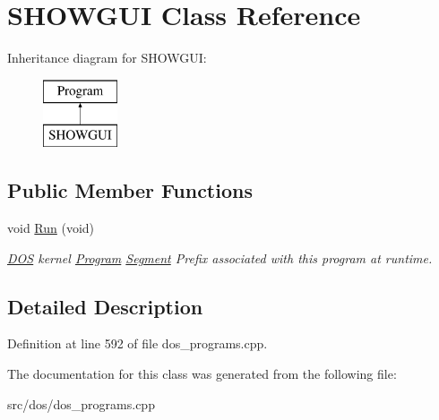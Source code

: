 \hypertarget{classSHOWGUI}{\section{S\-H\-O\-W\-G\-U\-I Class Reference}
\label{classSHOWGUI}
}
Inheritance diagram for S\-H\-O\-W\-G\-U\-I\-:\begin{figure}[H]
\begin{center}
\leavevmode
\includegraphics[height=2.000000cm]{classSHOWGUI}
\end{center}
\end{figure}
\subsection*{Public Member Functions}
\begin{DoxyCompactItemize}
\item 
\hypertarget{classSHOWGUI_a6aa41914fca5264f9c63856c9578dd29}{void \hyperlink{classSHOWGUI_a6aa41914fca5264f9c63856c9578dd29}{Run} (void)}\label{classSHOWGUI_a6aa41914fca5264f9c63856c9578dd29}

\begin{DoxyCompactList}\small\item\em \hyperlink{classDOS}{D\-O\-S} kernel \hyperlink{classProgram}{Program} \hyperlink{structSegment}{Segment} Prefix associated with this program at runtime. \end{DoxyCompactList}\end{DoxyCompactItemize}


\subsection{Detailed Description}


Definition at line 592 of file dos\-\_\-programs.\-cpp.



The documentation for this class was generated from the following file\-:\begin{DoxyCompactItemize}
\item 
src/dos/dos\-\_\-programs.\-cpp\end{DoxyCompactItemize}
